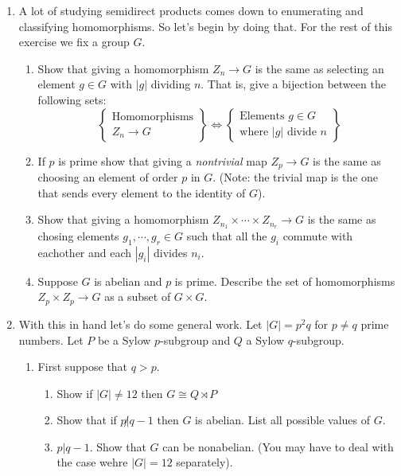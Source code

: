 \documentclass[11pt]{article}
\begin{document}
\begin{enumerate}
  \item{
  A lot of studying semidirect products comes down to enumerating and classifying homomorphisms.  So let's begin by doing that.  For the rest of this exercise we fix a group $G$.
  \begin{enumerate}
    \item{
    Show that giving a homomorphism $Z_n\to G$ is the same as selecting an element $g\in G$ with $|g|$ dividing $n$.  That is, give a bijection between the following sets:
    \[\left\{
    \begin{array}{c}
      \text{Homomorphisms}\\
      Z_n\to G
    \end{array}\right\}
    \Longleftrightarrow
    \left\{
    \begin{array}{c}
      \text{Elements }g\in G\\
      \text{where }|g|\text{ divide }n
    \end{array}
    \right\}
    \]
    }
    \item{
    If $p$ is prime show that giving a \textit{nontrivial} map $Z_p\to G$ is the same as choosing an element of order $p$ in $G$. (Note: the trivial map is the one that sends every element to the identity of $G$).
    }
    \item{
    Show that giving a homomorphism $Z_{n_1}\times\cdots\times Z_{n_r}\to G$ is the same as chosing elements $g_1,\cdots,g_r\in G$ such that all the $g_i$ commute with eachother and each $|g_i|$ divides $n_i$.
    }
    \item{
    Suppose $G$ is abelian and $p$ is prime.  Describe the set of homomorphisms $Z_p\times Z_p\to G$ as a subset of $G\times G$.
    }
  \end{enumerate}
  }
  \item{With this in hand let's do some general work.  Let $|G| = p^2q$ for $p\not=q$ prime numbers.  Let $P$ be a Sylow $p$-subgroup and $Q$ a Sylow $q$-subgroup.
  \begin{enumerate}
    \item{
    First suppose that $q>p$.
    \begin{enumerate}
      \item{
      Show if $|G|\not=12$ then $G\cong Q\rtimes P$
      }
      \item{
      Show that if $p\not|q-1$ then $G$ is abelian.  List all possible values of $G$.
      }
      \item{
      $p|q-1$.  Show that $G$ can be nonabelian.  (You may have to deal with the case wehre $|G|=12$ separately).
}
\end{enumerate}}
\end{enumerate}}
\end{enumerate}
\end{document}
